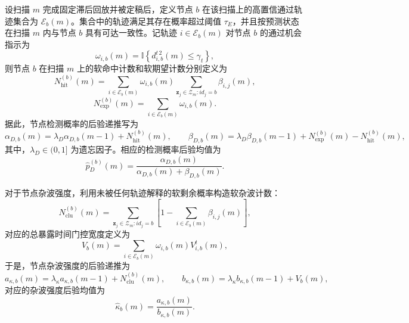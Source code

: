 \documentclass{xdupgthesis}
\begin{document}
设扫描 $m$ 完成固定滞后回放并被定稿后，定义节点 $b$ 在该扫描上的高置信通过轨迹集合为 $\mathcal E_b(m)$。集合中的轨迹满足其存在概率超过阈值 $\tau_E$，并且按预测状态在扫描 $m$ 内与节点 $b$ 具有可达一致性。记轨迹 $i\in\mathcal E_b(m)$ 对节点 $b$ 的通过机会指示为
\begin{equation}
	\omega_{i,b}(m)=\mathbb I\left\{d^{t\,2}_{i,b}(m)\le \gamma_t\right\},
	\label{eq:ch3_pass_indicator}
\end{equation}
则节点 $b$ 在扫描 $m$ 上的软命中计数和软期望计数分别定义为
\begin{equation}
	N_{\mathrm{hit}}^{(b)}(m)
	=
	\sum_{i\in\mathcal E_b(m)}
	\omega_{i,b}(m)
	\sum_{\mathbf z_j\in \mathcal Z_m:id_j=b}
	\beta_{i,j}(m),
	\label{eq:ch3_soft_hit}
\end{equation}
\begin{equation}
	N_{\mathrm{exp}}^{(b)}(m)
	=
	\sum_{i\in\mathcal E_b(m)}
	\omega_{i,b}(m).
	\label{eq:ch3_soft_exp}
\end{equation}
据此，节点检测概率的后验递推写为
\begin{equation}
	\alpha_{D,b}(m)=\lambda_D\alpha_{D,b}(m-1)+N_{\mathrm{hit}}^{(b)}(m),
	\qquad
	\beta_{D,b}(m)=\lambda_D\beta_{D,b}(m-1)+N_{\mathrm{exp}}^{(b)}(m)-N_{\mathrm{hit}}^{(b)}(m),
	\label{eq:ch3_beta_update}
\end{equation}
其中，$\lambda_D\in(0,1]$ 为遗忘因子。相应的检测概率后验均值为
\begin{equation}
	\hat p_D^{(b)}(m)=\frac{\alpha_{D,b}(m)}{\alpha_{D,b}(m)+\beta_{D,b}(m)}.
	\label{eq:ch3_pD_mean}
\end{equation}

对于节点杂波强度，利用未被任何轨迹解释的软剩余概率构造软杂波计数：
\begin{equation}
	N_{\mathrm{clu}}^{(b)}(m)
	=
	\sum_{\mathbf z_j\in \mathcal Z_m:id_j=b}
	\left[1-\sum_{i\in\mathcal E_b(m)}\beta_{i,j}(m)\right],
	\label{eq:ch3_soft_clutter}
\end{equation}
对应的总暴露时间门控宽度定义为
\begin{equation}
	V_b(m)=
	\sum_{i\in\mathcal E_b(m)}
	\omega_{i,b}(m)V^{t}_{i,b}(m),
	\label{eq:ch3_exposure_volume}
\end{equation}
于是，节点杂波强度的后验递推为
\begin{equation}
	a_{\kappa,b}(m)=\lambda_{\kappa}a_{\kappa,b}(m-1)+N_{\mathrm{clu}}^{(b)}(m),
	\qquad
	b_{\kappa,b}(m)=\lambda_{\kappa}b_{\kappa,b}(m-1)+V_b(m),
	\label{eq:ch3_kappa_update}
\end{equation}
对应的杂波强度后验均值为
\begin{equation}
	\hat\kappa_b(m)=\frac{a_{\kappa,b}(m)}{b_{\kappa,b}(m)}.
	\label{eq:ch3_kappa_mean_v2}
\end{equation}
\end{document}
